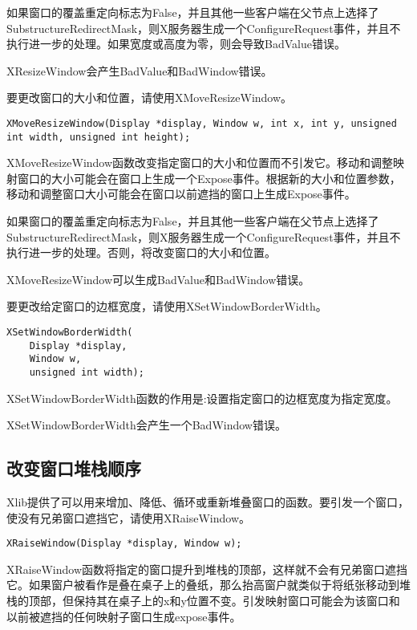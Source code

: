 如果窗口的覆盖重定向标志为False，并且其他一些客户端在父节点上选择了SubstructureRedirectMask，则X服务器生成一个ConfigureRequest事件，并且不执行进一步的处理。如果宽度或高度为零，则会导致BadValue错误。

\noindent XResizeWindow会产生BadValue和BadWindow错误。

\noindent 要更改窗口的大小和位置，请使用XMoveResizeWindow。

\begin{lstlisting}
XMoveResizeWindow(Display *display, Window w, int x, int y, unsigned int width, unsigned int height);
\end{lstlisting}

XMoveResizeWindow函数改变指定窗口的大小和位置而不引发它。移动和调整映射窗口的大小可能会在窗口上生成一个Expose事件。根据新的大小和位置参数，移动和调整窗口大小可能会在窗口以前遮挡的窗口上生成Expose事件。

如果窗口的覆盖重定向标志为False，并且其他一些客户端在父节点上选择了SubstructureRedirectMask，则X服务器生成一个ConfigureRequest事件，并且不执行进一步的处理。否则，将改变窗口的大小和位置。

\noindent XMoveResizeWindow可以生成BadValue和BadWindow错误。

\noindent 要更改给定窗口的边框宽度，请使用XSetWindowBorderWidth。
\begin{lstlisting}
XSetWindowBorderWidth(
	Display *display,
	Window w,
	unsigned int width);
\end{lstlisting}

\noindent XSetWindowBorderWidth函数的作用是:设置指定窗口的边框宽度为指定宽度。

\noindent XSetWindowBorderWidth会产生一个BadWindow错误。

\subsection{改变窗口堆栈顺序}

\noindent Xlib提供了可以用来增加、降低、循环或重新堆叠窗口的函数。要引发一个窗口，使没有兄弟窗口遮挡它，请使用XRaiseWindow。

\begin{lstlisting}
XRaiseWindow(Display *display, Window w);
\end{lstlisting}

XRaiseWindow函数将指定的窗口提升到堆栈的顶部，这样就不会有兄弟窗口遮挡它。如果窗户被看作是叠在桌子上的叠纸，那么抬高窗户就类似于将纸张移动到堆栈的顶部，但保持其在桌子上的x和y位置不变。引发映射窗口可能会为该窗口和以前被遮挡的任何映射子窗口生成expose事件。


